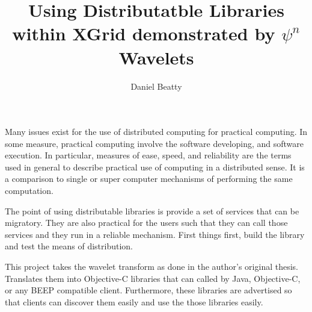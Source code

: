 \documentclass[11pt]{article}
\title{Using Distributatble Libraries within XGrid demonstrated by $\psi^n$ Wavelets}
\author{Daniel Beatty}
\begin{document}
\maketitle

Many issues exist for the use of distributed computing for practical computing.  In some measure, practical computing involve the software developing, and software execution.  In particular, measures of ease, speed, and reliability are the terms used in general to describe practical use of computing in a distributed sense.  It is a comparison to single or super computer mechanisms of performing the same computation.   

The point of using distributable libraries is provide a set of services that can be migratory.  They are also practical for the users such that they can call those services and they run in a reliable mechanism.  First things first, build the library and test the means of distribution.  

This project takes the wavelet transform as done in the author's original thesis.  Translates them into Objective-C libraries that can called by Java, Objective-C, or any BEEP compatible client.     Furthermore, these libraries are advertised so that clients can discover them easily and use the those libraries easily.  



 
\end{document}
